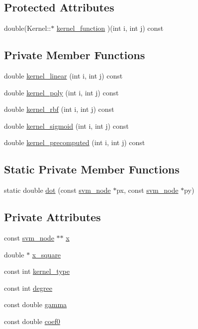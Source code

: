 \subsection*{Protected Attributes}
\begin{DoxyCompactItemize}
\item 
double(Kernel\+::$\ast$ \hyperlink{classKernel_ac7b39305896e51f9e1a08e026e2c4d9c}{kernel\+\_\+function} )(int i, int j) const 
\end{DoxyCompactItemize}
\subsection*{Private Member Functions}
\begin{DoxyCompactItemize}
\item 
double \hyperlink{classKernel_a9ccd52d8f291ab38be66944257420a87}{kernel\+\_\+linear} (int i, int j) const 
\item 
double \hyperlink{classKernel_af9a74728d70af7ec68947b1e443a5dc5}{kernel\+\_\+poly} (int i, int j) const 
\item 
double \hyperlink{classKernel_a78f1025eae410c560c8e55845b2fcb3f}{kernel\+\_\+rbf} (int i, int j) const 
\item 
double \hyperlink{classKernel_a16d668579ecb347c4188f8772ca00547}{kernel\+\_\+sigmoid} (int i, int j) const 
\item 
double \hyperlink{classKernel_aa7bce181dce4b32b1d84b0483006d934}{kernel\+\_\+precomputed} (int i, int j) const 
\end{DoxyCompactItemize}
\subsection*{Static Private Member Functions}
\begin{DoxyCompactItemize}
\item 
static double \hyperlink{classKernel_af258ecfb8ca0182e6a79c06291586e5b}{dot} (const \hyperlink{structsvm__node}{svm\+\_\+node} $\ast$px, const \hyperlink{structsvm__node}{svm\+\_\+node} $\ast$py)
\end{DoxyCompactItemize}
\subsection*{Private Attributes}
\begin{DoxyCompactItemize}
\item 
const \hyperlink{structsvm__node}{svm\+\_\+node} $\ast$$\ast$ \hyperlink{classKernel_a725a35660c4309605c2628fa8290ce5f}{x}
\item 
double $\ast$ \hyperlink{classKernel_a97ca8abb41cd6ba8b1553738d59352d5}{x\+\_\+square}
\item 
const int \hyperlink{classKernel_a01e78214a5c60876d71ee05fe97f4566}{kernel\+\_\+type}
\item 
const int \hyperlink{classKernel_a332697fbc977298e3f8701224dbe4bf0}{degree}
\item 
const double \hyperlink{classKernel_a3a8a0a00a7d58708d6a7c5bc9c872513}{gamma}
\item 
const double \hyperlink{classKernel_a9b78d78675c9d5094daabf85c1d63b5d}{coef0}
\end{DoxyCompactItemize}


